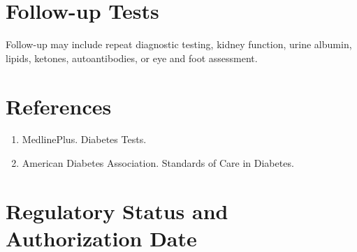 \section*{Follow-up Tests} Follow-up may include repeat diagnostic testing, kidney function, urine albumin, lipids, ketones, autoantibodies, or eye and foot assessment.
\section*{References} \begin{enumerate}\item MedlinePlus. Diabetes Tests.\item American Diabetes Association. Standards of Care in Diabetes.\end{enumerate}
\clearpage\section*{Regulatory Status and Authorization Date}\clearpage
